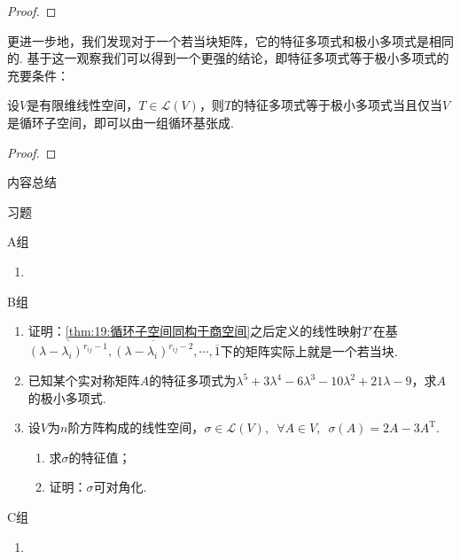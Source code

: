 \begin{proof}

\end{proof}

更进一步地，我们发现对于一个若当块矩阵，它的特征多项式和极小多项式是相同的. 基于这一观察我们可以得到一个更强的结论，即特征多项式等于极小多项式的充要条件：
\begin{theorem} \label{thm:19:特征多项式等于极小多项式}
    设$V$是有限维线性空间，$T\in \mathcal{L}(V)$，则$T$的特征多项式等于极小多项式当且仅当$V$是循环子空间，即可以由一组循环基张成.
\end{theorem}
\begin{proof}

\end{proof}

\vspace{2ex}
\centerline{\heiti \Large 内容总结}

\vspace{2ex}
\centerline{\heiti \Large 习题}

\vspace{2ex}
{\kaishu }
\begin{flushright}
    \kaishu

\end{flushright}

\centerline{\heiti A组}
\begin{enumerate}
    \item
\end{enumerate}

\centerline{\heiti B组}
\begin{enumerate}
    \item 证明：\autoref{thm:19:循环子空间同构于商空间}之后定义的线性映射$T'$在基$\overline{(\lambda-\lambda_i)^{r_{ij}-1}},\overline{(\lambda-\lambda_i)^{r_{ij}-2}},\cdots,\overline{1}$下的矩阵实际上就是一个若当块.
    \item 已知某个实对称矩阵$A$的特征多项式为$\lambda^5+3\lambda^4-6\lambda^3-10\lambda^2+21\lambda-9$，求$A$的极小多项式.
    \item 设$V$为$n$阶方阵构成的线性空间，$\sigma\in \mathcal{L}(V),\enspace \forall A\in V,\enspace \sigma(A)=2A-3A^{\mathrm{T}}$.
    \begin{enumerate}
        \item 求$\sigma$的特征值；
        \item 证明：$\sigma$可对角化.
    \end{enumerate}
\end{enumerate}

\centerline{\heiti C组}
\begin{enumerate}
    \item
\end{enumerate}
